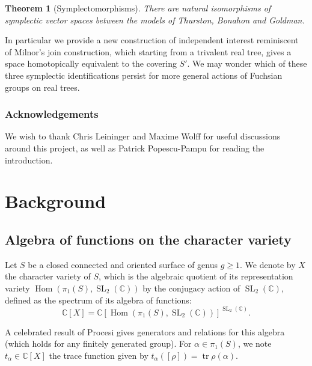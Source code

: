 \documentclass{amsart}
\newtheorem{theoremintro}{Theorem}
\newcommand{\C}{\mathbb{C}}
\DeclareMathOperator{\Hom}{Hom}
\DeclareMathOperator{\SL}{SL}
\DeclareMathOperator{\tr}{tr}
\begin{document}
\begin{theoremintro}[Symplectomorphisms]
There are natural isomorphisms of symplectic vector spaces between the models of Thurston, Bonahon and Goldman.
\end{theoremintro}

In particular we provide a new construction of independent interest reminiscent of Milnor's join construction, which starting from a trivalent real tree, gives a space homotopically equivalent to the covering $S'$.
%
We may wonder which of these three symplectic identifications persist for more general actions of Fuchsian groups on real trees.


\renewcommand{\contentsname}{Plan of the paper}
\setcounter{tocdepth}{1}
\tableofcontents

\subsubsection*{Acknowledgements}
We wish to thank Chris Leininger and Maxime Wolff for useful discussions around this project, as well as Patrick Popescu-Pampu for reading the introduction.


\section{Background}

\subsection{Algebra of functions on the character variety}

Let $S$ be a closed connected and oriented surface of genus $g\ge 1$. We denote by $X$ the character variety of $S$, which is the algebraic quotient of its representation variety $\Hom(\pi_1(S),\SL_2(\C))$ by the conjugacy action of $\SL_2(\C)$, defined as the spectrum of its algebra of functions:
$$\C[X]=\C[\Hom(\pi_1(S),\SL_2(\C))]^{\SL_2(\C)}.$$

A celebrated result of Procesi gives generators and relations for this algebra (which holds for any finitely generated group).
For $\alpha\in \pi_1(S)$, we note $t_\alpha\in \C[X]$ the trace function given by $t_\alpha([\rho])=\tr \rho(\alpha)$. 
\end{document}
